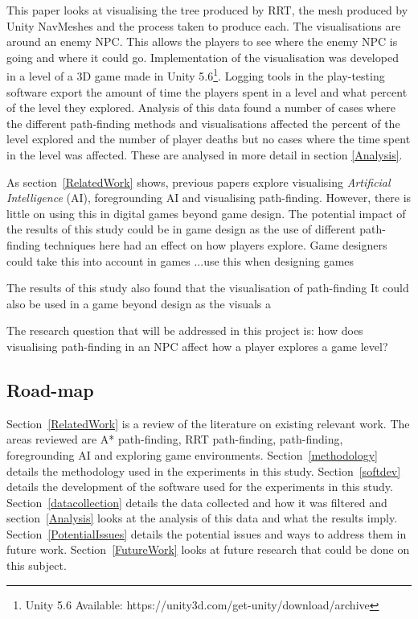 \documentclass[journal]{IEEEtran}
\begin{document}
	This paper looks at visualising the tree produced by RRT, the mesh produced by Unity NavMeshes and the process taken to produce each. The visualisations are around an enemy NPC. This allows the players to see where the enemy NPC is going and where it could go.      
	Implementation of the visualisation was developed in a level of a 3D game made in Unity 5.6\footnote[1]{Unity 5.6 Available: https://unity3d.com/get-unity/download/archive}. Logging tools in the play-testing software export the amount of time the players spent in a level and what percent of the level they explored. Analysis of this data found a number of cases where the different path-finding methods and visualisations affected the percent of the level explored and the number of player deaths but no cases where the time spent in the level was affected. These are analysed in more detail in section \ref{Analysis}.
	
	As section~\ref{RelatedWork} shows, previous papers explore visualising \textit{Artificial Intelligence} (AI), foregrounding AI and visualising path-finding. However, there is little on using this in digital games beyond game design. The potential impact of the results of this study could be in game design as the use of different path-finding techniques here had an effect on how players explore. Game designers could take this into account in games ...use this when designing games
	
	The results of this study also found that the visualisation of path-finding It could also be used in a game beyond design as the visuals a
	
	The research question that will be addressed in this project is: how does visualising path-finding in an NPC affect how a player explores a game level?
	
	
	\subsection{Road-map}
	Section~\ref{RelatedWork} is a review of the literature on existing relevant work. The areas reviewed are A* path-finding, RRT path-finding, path-finding, foregrounding AI and exploring game environments. 
	Section~\ref{methodology} details the methodology used in the experiments in this study. Section~\ref{softdev} details the development of the software used for the experiments in this study.
	Section~\ref{datacollection} details the data collected and how it was filtered and section~\ref{Analysis} looks at the analysis of this data and what the results imply. Section~\ref{PotentialIssues} details the potential issues and ways to address them in future work. Section~\ref{FutureWork} looks at future research that could be done on this subject. 
	
\end{document}
